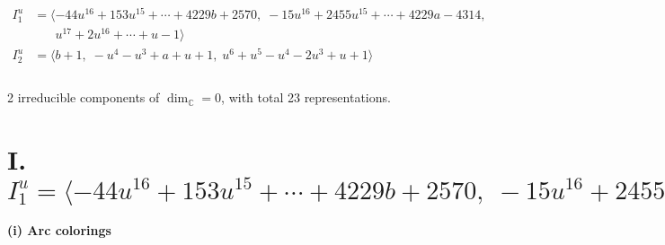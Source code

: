 \documentclass[1p]{elsarticle_modified}
\theoremstyle{definition}
\begin{document}
\begin{align*}
I^u_{1}&=\langle 
-44 u^{16}+153 u^{15}+\cdots+4229 b+2570,\;-15 u^{16}+2455 u^{15}+\cdots+4229 a-4314,\\
\phantom{I^u_{1}}&\phantom{= \langle  }u^{17}+2 u^{16}+\cdots+u-1\rangle \\
I^u_{2}&=\langle 
b+1,\;- u^4- u^3+a+u+1,\;u^6+u^5- u^4-2 u^3+u+1\rangle \\
\\
\end{align*}
\raggedright * 2 irreducible components of $\dim_{\mathbb{C}}=0$, with total 23 representations.\\
\newpage
\renewcommand{\arraystretch}{1}
\centering \section*{I. $I^u_{1}= \langle -44 u^{16}+153 u^{15}+\cdots+4229 b+2570,\;-15 u^{16}+2455 u^{15}+\cdots+4229 a-4314,\;u^{17}+2 u^{16}+\cdots+u-1 \rangle$}
\flushleft \textbf{(i) Arc colorings}\\
\end{document}
